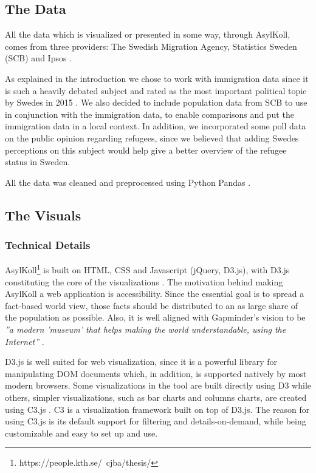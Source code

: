 \documentclass{acmtog} %
\begin{document}
\subsection{The Data}
\label{sub:data}
All the data which is visualized or presented in some way, through AsylKoll, comes from three providers: The Swedish Migration Agency, Statistics Sweden (SCB) and Ipsos \cite{migrationsverket,scb,ipsos}. 

As explained in the introduction we chose to work with immigration data since it is such a heavily debated subject and rated as the most important political topic by Swedes in 2015 \cite{svt,dn}. We also decided to include population data from SCB to use in conjunction with the immigration data, to enable comparisons and put the immigration data in a local context. In addition, we incorporated some poll data on the public opinion regarding refugees, since we believed that adding Swedes perceptions on this subject would help give a better overview of the refugee status in Sweden.

All the data was cleaned and preprocessed using Python Pandas \cite{pandas}.

\subsection{The Visuals}
\label{sub:visuals}
\subsubsection{Technical Details}
AsylKoll\footnote{https://people.kth.se/~cjba/thesis/} is built on HTML, CSS and Javascript (jQuery, D3.js), with D3.js constituting the core of the visualizations \cite{d3}. The motivation behind making AsylKoll a web application is accessibility. Since the essential goal is to spread a fact-based world view, those facts should be distributed to an as large share of the population as possible. Also, it is well aligned with Gapminder's vision to be \emph{''a modern 'museum' that helps making the world understandable, using the Internet''} \cite{gapminder}.

D3.js is well suited for web visualization, since it is a powerful library for manipulating DOM documents which, in addition, is supported natively by most modern browsers. Some visualizations in the tool are built directly using D3 while others, simpler visualizations, such as bar charts and columns charts, are created using C3.js \cite{c3}. C3 is a visualization framework built on top of D3.js. The reason for using C3.js is its default support for filtering and details-on-demand, while being customizable and easy to set up and use.
\end{document}
